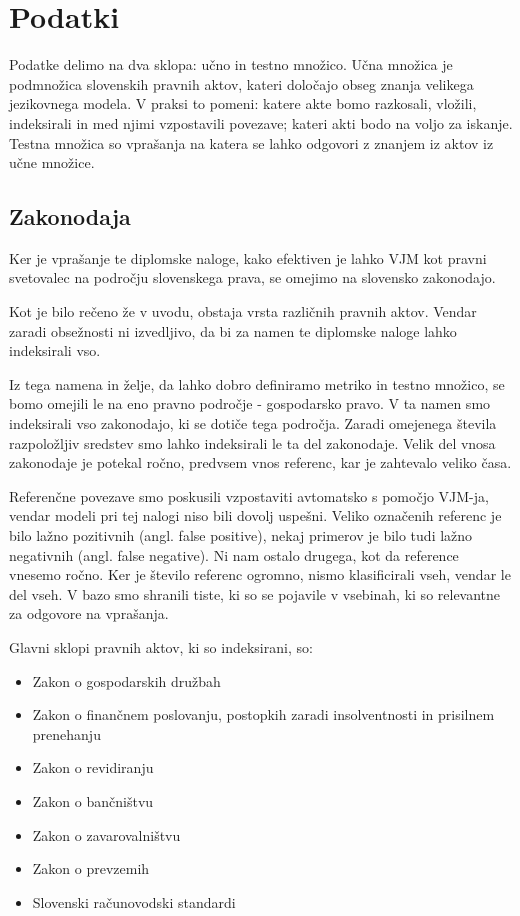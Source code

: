 \documentclass[a4paper,12pt,openright]{book}
\begin{document}
\chapter{Podatki}
\label{ch2}

Podatke delimo na dva sklopa: učno in testno množico. Učna množica je podmnožica slovenskih pravnih aktov, kateri določajo obseg znanja velikega jezikovnega modela. V praksi to pomeni: katere akte bomo razkosali, vložili, indeksirali in med njimi vzpostavili povezave; kateri akti bodo na voljo za iskanje. Testna množica so vprašanja na katera se lahko odgovori z znanjem iz aktov iz učne množice.

\section{Zakonodaja}

Ker je vprašanje te diplomske naloge, kako efektiven je lahko VJM kot pravni svetovalec na področju slovenskega prava, se omejimo na slovensko zakonodajo.

Kot je bilo rečeno že v uvodu, obstaja vrsta različnih pravnih aktov. Vendar zaradi obsežnosti ni izvedljivo, da bi za namen te diplomske naloge lahko indeksirali vso.

Iz tega namena in želje, da lahko dobro definiramo metriko in testno množico, se bomo omejili le na eno pravno področje - gospodarsko pravo. V ta namen smo indeksirali vso zakonodajo, ki se dotiče tega področja. Zaradi omejenega števila razpoložljiv sredstev smo lahko indeksirali le ta del zakonodaje. Velik del vnosa zakonodaje je potekal ročno, predvsem vnos referenc, kar je zahtevalo veliko časa.

Referenčne povezave smo poskusili vzpostaviti avtomatsko s pomočjo VJM-ja, vendar modeli pri tej nalogi niso bili dovolj uspešni. Veliko označenih referenc je bilo lažno pozitivnih (angl. false positive), nekaj primerov je bilo tudi lažno negativnih (angl. false negative). Ni nam ostalo drugega, kot da reference vnesemo ročno. Ker je število referenc ogromno, nismo klasificirali vseh, vendar le del vseh. V bazo smo shranili tiste, ki so se pojavile v vsebinah, ki so relevantne za odgovore na vprašanja.

Glavni sklopi pravnih aktov, ki so indeksirani, so:

\begin{itemize}
    \item Zakon o gospodarskih družbah
    \item Zakon o finančnem poslovanju, postopkih zaradi insolventnosti in prisilnem prenehanju
    \item Zakon o revidiranju
    \item Zakon o bančništvu
    \item Zakon o zavarovalništvu
    \item Zakon o prevzemih
    \item Slovenski računovodski standardi
\end{itemize}
\end{document}
